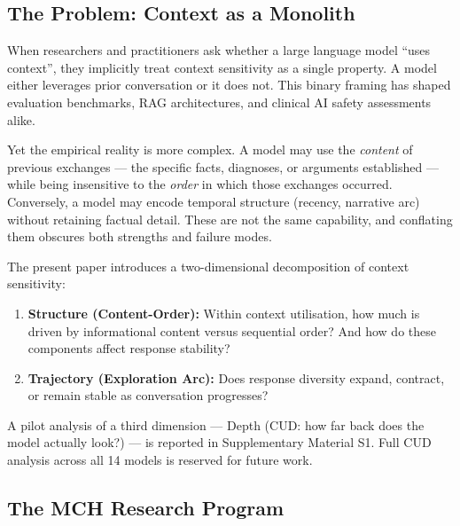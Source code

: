 \documentclass[11pt,a4paper]{article}
\begin{document}
\subsection{The Problem: Context as a Monolith}

When researchers and practitioners ask whether a large language model ``uses context'', they implicitly treat context sensitivity as a single property. A model either leverages prior conversation or it does not. This binary framing has shaped evaluation benchmarks, RAG architectures, and clinical AI safety assessments alike.

Yet the empirical reality is more complex. A model may use the \emph{content} of previous exchanges --- the specific facts, diagnoses, or arguments established --- while being insensitive to the \emph{order} in which those exchanges occurred. Conversely, a model may encode temporal structure (recency, narrative arc) without retaining factual detail. These are not the same capability, and conflating them obscures both strengths and failure modes.

The present paper introduces a two-dimensional decomposition of context sensitivity:

\begin{enumerate}
    \item \textbf{Structure (Content-Order):} Within context utilisation, how much is driven by informational content versus sequential order? And how do these components affect response stability?
    \item \textbf{Trajectory (Exploration Arc):} Does response diversity expand, contract, or remain stable as conversation progresses?
\end{enumerate}

A pilot analysis of a third dimension --- Depth (CUD: how far back does the model actually look?) --- is reported in Supplementary Material S1. Full CUD analysis across all 14 models is reserved for future work.

\subsection{The MCH Research Program}
\end{document}
